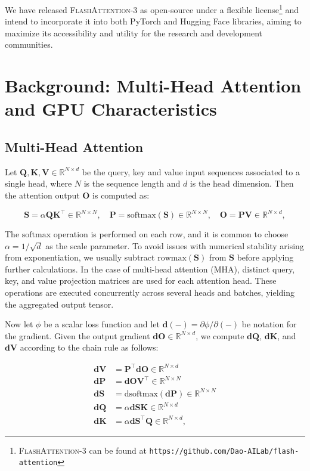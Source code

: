 \begin{enumerate}
We have released \textsc{FlashAttention-3} as open-source under a flexible license\footnote{\textsc{FlashAttention-3}
  can be found at \texttt{https://github.com/Dao-AILab/flash-attention}} and intend to incorporate it into both PyTorch and Hugging Face libraries, aiming to maximize its accessibility and utility for the research and development communities.

\section{Background: Multi-Head Attention and GPU Characteristics}
\label{sec:background}

\subsection{Multi-Head Attention}
\label{subsec:multi_head_attn}

Let $\mathbf{Q}, \mathbf{K}, \mathbf{V} \in \mathbb{R}^{N \times d}$ be the query, key and value input sequences associated to a single head, where $N$ is the sequence length and $d$ is the head dimension. Then the attention output $\mathbf{O}$ is computed as:

\begin{equation*}
  \mathbf{S} = \alpha \mathbf{Q} \mathbf{K}^\top \in \mathbb{R}^{N \times N}, \quad \mathbf{P} = \mathrm{softmax}(\mathbf{S}) \in \mathbb{R}^{N \times N}, \quad \mathbf{O} = \mathbf{P}\mathbf{V} \in \mathbb{R}^{N \times d},
\end{equation*}

The $\mathrm{softmax}$ operation is performed on each row, and it is common to choose $\alpha = 1/\sqrt{d}$ as the scale parameter. To avoid issues with numerical stability arising from exponentiation, we usually subtract $\mathrm{rowmax}(\mathbf{S})$ from $\mathbf{S}$ before applying further calculations. In the case of multi-head attention (MHA), distinct query, key, and value projection matrices are used for each attention head. These operations are executed concurrently across several heads and batches, yielding the aggregated output tensor.

Now let $\phi$ be a scalar loss function and let $\mathbf{d}(-) = \partial \phi / \partial (-)$ be notation for the gradient. Given the output gradient $\mathbf{dO} \in \mathbb{R}^{N \times d}$, we compute $\mathbf{dQ}$, $\mathbf{dK}$, and $\mathbf{dV}$ according to the chain rule as follows:

\begin{align*}
  \mathbf{dV} &= \mathbf{P}^\top \mathbf{dO} \in \mathbb{R}^{N \times d} \\
  \mathbf{dP} &= \mathbf{dO} \mathbf{V}^\top \in \mathbb{R}^{N \times N} \\
  \mathbf{dS} &= \mathrm{dsoftmax} (\mathbf{dP}) \in \mathbb{R}^{N \times N} \\
  \mathbf{dQ} &= \alpha \mathbf{dS} \mathbf{K} \in \mathbb{R}^{N \times d} \\
  \mathbf{dK} &= \alpha \mathbf{dS}^\top \mathbf{Q} \in \mathbb{R}^{N \times d},
\end{align*}


\end{enumerate}

